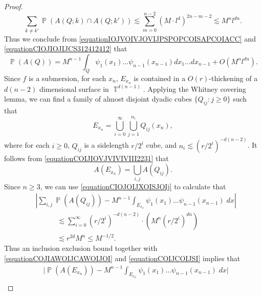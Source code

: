 \documentclass[dvipsnames,letterpaper,12pt]{article}
\numberwithin{equation}{section}
\DeclareMathOperator{\TT}{\mathbb{T}}
\numberwithin{theorem}{section}
\DeclareMathOperator{\PP}{\mathbb{P}}
\begin{document}
\begin{proof}
\begin{equation}
        \sum_{k \neq k'} \PP(A(Q;k) \cap A(Q;k')) \lesssim \sum_{m = 0}^{n-2} (M \cdot l^d)^{2n-m-2} \lesssim M^n l^{dn}.
    \end{equation}
    Thus we conclude from \eqref{equationIOJVOIVJOVIJPSPOPCOISAPCOIACC} and \eqref{equationCIOJIOJIJCS312412412} that
    \begin{equation} \label{equationCIOJOIJXOISJOIj}
        \PP(A(Q)) = M^{n-1} \int_Q \psi_1(x_1) \dots \psi_{n-1}(x_{n-1}) dx_1 \dots dx_{n-1} + O(M^n l^{dn}).
    \end{equation}
    Since $f$ is a submersion, for each $x_n$, $E_{x_n}$ is contained in a $O(r)$-thickening of a $d(n-2)$ dimensional surface in $\TT^{d(n-1)}$. Applying the Whitney covering lemma, we can find a family of almost disjoint dyadic cubes $\{ Q_{ij} : j \geq 0 \}$ such that
    \begin{equation} \label{equationCOIJIOVJVIVIVIII2231}
        E_{x_n} = \bigcup_{i = 0}^\infty \bigcup_{j = 1}^{n_i} Q_{ij}(x_n),
    \end{equation}
    where for each $i \geq 0$, $Q_{ij}$ is a sidelength $r/2^i$ cube, and $n_i \lesssim (r/2^i)^{-d(n-2)}$. It follows from \eqref{equationCOIJIOVJVIVIVIII2231} that
    \begin{equation} \label{equationCOJIAWOIJCAWOIJOI}
        A(E_{x_n}) = \bigcup_{i,j} A(Q_{ij}).
    \end{equation}
    Since $n \geq 3$, we can use \eqref{equationCIOJOIJXOISJOIj} to calculate that
    \begin{equation} \label{equationCOIJCOIJSI}
    \begin{split}
        &\left| \sum_{i,j} \PP(A(Q_{ij})) - M^{n-1} \int_{E_{x_n}} \psi_1(x_1) \dots \psi_{n-1}(x_{n-1})\; dx \right|\\
        &\quad\quad\quad\lesssim \sum_{i = 0}^\infty (r/2^i)^{-d(n-2)} \cdot \left( M^n (r/2^i)^{dn} \right)\\
        &\quad\quad\quad\lesssim r^{2d} M^n \leq M^{-1/2}.
    \end{split}
    \end{equation}
    Thus an inclusion exclusion bound together with \eqref{equationCOJIAWOIJCAWOIJOI} and \eqref{equationCOIJCOIJSI} implies that
    \begin{equation} \label{equationvVIDJDIJ21312ffijsijds}
    \begin{split}
        &\Big| \PP(A(E_{x_n})) - M^{n-1} \int_{E_{x_n}} \psi_1(x_1) \dots \psi_{n-1}(x_{n-1})\; dx \Big|\\

\end{split}
\end{equation}
\end{proof}
\end{document}
